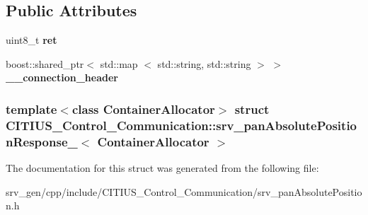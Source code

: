 \subsection*{\-Public \-Attributes}
\begin{DoxyCompactItemize}
\item 
\hypertarget{struct_c_i_t_i_u_s___control___communication_1_1srv__pan_absolute_position_response___a6ed5e191d1ac668422439e5193df0694}{uint8\-\_\-t {\bfseries ret}}\label{struct_c_i_t_i_u_s___control___communication_1_1srv__pan_absolute_position_response___a6ed5e191d1ac668422439e5193df0694}

\item 
\hypertarget{struct_c_i_t_i_u_s___control___communication_1_1srv__pan_absolute_position_response___a5e0be509c132cc740a371eada60041ab}{boost\-::shared\-\_\-ptr$<$ std\-::map\*
$<$ std\-::string, std\-::string $>$ $>$ {\bfseries \-\_\-\-\_\-connection\-\_\-header}}\label{struct_c_i_t_i_u_s___control___communication_1_1srv__pan_absolute_position_response___a5e0be509c132cc740a371eada60041ab}

\end{DoxyCompactItemize}
\subsubsection*{template$<$class Container\-Allocator$>$ struct C\-I\-T\-I\-U\-S\-\_\-\-Control\-\_\-\-Communication\-::srv\-\_\-pan\-Absolute\-Position\-Response\-\_\-$<$ Container\-Allocator $>$}



\-The documentation for this struct was generated from the following file\-:\begin{DoxyCompactItemize}
\item 
srv\-\_\-gen/cpp/include/\-C\-I\-T\-I\-U\-S\-\_\-\-Control\-\_\-\-Communication/srv\-\_\-pan\-Absolute\-Position.\-h\end{DoxyCompactItemize}

